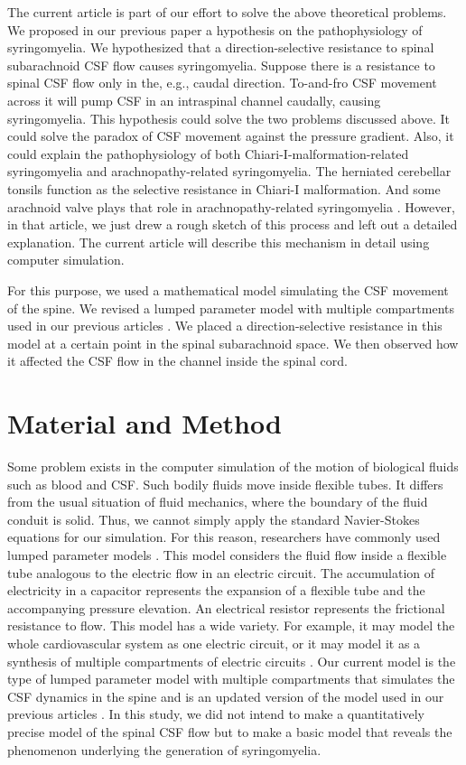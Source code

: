 \documentclass[fleqn,10pt]{wlscirep}
\begin{document}
The current article is part of our effort to solve the above theoretical
problems. We proposed in our previous paper \cite{chang2021hypothesis} a
hypothesis on the pathophysiology of syringomyelia. We hypothesized that a
direction-selective resistance to spinal subarachnoid CSF flow causes
syringomyelia. Suppose there is a resistance to spinal CSF flow only in
the, e.g., caudal direction. To-and-fro CSF movement across it will pump
CSF in an intraspinal channel caudally, causing syringomyelia. This
hypothesis could solve the two problems discussed above. It could solve the
paradox of CSF movement against the pressure gradient. Also, it could
explain the pathophysiology of both Chiari-I-malformation-related
syringomyelia and arachnopathy-related syringomyelia. The herniated
cerebellar tonsils function as the selective resistance in Chiari-I
malformation. And some arachnoid valve plays that role in
arachnopathy-related syringomyelia \cite{chang2014dorsal}. However, in that
article, we just drew a rough sketch of this process and left out a
detailed explanation. The current article will describe this mechanism in
detail using computer simulation.

For this purpose, we used a mathematical model simulating the CSF movement
of the spine. We revised a lumped parameter model with multiple
compartments used in our previous articles \cite{chang2003hypothesis,
chang2004theoretical}.  We placed a direction-selective resistance in this
model at a certain point in the spinal subarachnoid space. We then observed
how it affected the CSF flow in the channel inside the spinal cord.

\section*{Material and Method}

Some problem exists in the computer simulation of the motion of biological
fluids such as blood and CSF. Such bodily fluids move inside flexible
tubes. It differs from the usual situation of fluid mechanics, where the
boundary of the fluid conduit is solid. Thus, we cannot simply apply the
standard Navier-Stokes equations for our simulation. For this reason,
researchers have commonly used lumped parameter models \cite{shi2011review,
kokalari2013review}. This model considers the fluid flow inside a flexible
tube analogous to the electric flow in an electric circuit. The
accumulation of electricity in a capacitor represents the expansion of a
flexible tube and the accompanying pressure elevation. An electrical
resistor represents the frictional resistance to flow. This model has a
wide variety. For example, it may model the whole cardiovascular system as
one electric circuit, or it may model it as a synthesis of multiple
compartments of electric circuits \cite{shi2011review, kokalari2013review}.
Our current model is the type of lumped parameter model with multiple
compartments that simulates the CSF dynamics in the spine and is an updated
version of the model used in our previous articles
\cite{chang2003hypothesis, chang2004theoretical}. In this study, we did not
intend to make a quantitatively precise model of the spinal CSF flow but to
make a basic model that reveals the phenomenon underlying the generation of
syringomyelia. 
\end{document}
